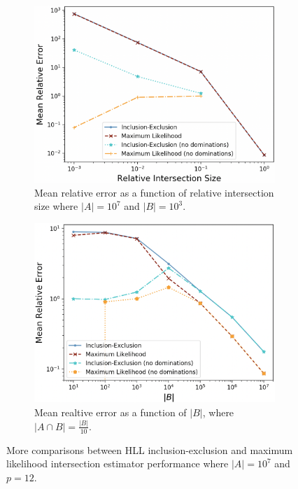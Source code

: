 \documentclass[10]{report}
\newcommand{\algoname}[1]{\textnormal{\textsc{#1}}}
\begin{document}
\begin{figure}
	\begin{center}
		\begin{subfigure}{0.49\linewidth}
			\centerline{\includegraphics[width=1.0\columnwidth]{relative_intersection_size_vs_relative_error_small}}
			\caption{Mean relative error as a function of relative intersection size where $|A| = 10^7$ and $|B| = 10^3$. \label{fig:relative_intersection_size_small}}
		\end{subfigure}
		\begin{subfigure}{0.49\linewidth}
			\centerline{\includegraphics[width=1.0\columnwidth]{B_size_vs_relative_error_tenth_intersection.png}}
			\caption{Mean realtive error as a function of $|B|$, where \\ $|A \cap B| = \frac{|B|}{10}$. \label{fig:relative_B_size}}
		\end{subfigure}
		\caption{More comparisons between \algoname{HLL} inclusion-exclusion and maximum likelihood intersection estimator performance where $|A| = 10^7$ and $p = 12$.
			\label{fig:more_intersection_comparisons}}
	\end{center}
\end{figure}
\end{document}
